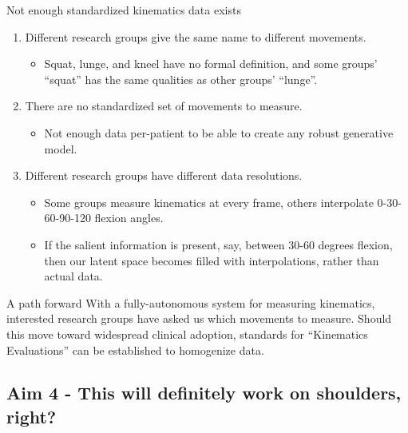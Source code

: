 \documentclass[presentation, aspectratio=1610]{beamer}
\begin{document}
\begin{frame}[label={sec:org3f98a28}]{Not enough standardized kinematics data exists}
\begin{enumerate}
\item Different research groups give the same name to different movements.
\begin{itemize}
\item Squat, lunge, and kneel have no formal definition, and some groups' ``squat'' has the same qualities as other groups' ``lunge''.
\end{itemize}
\item There are no standardized set of movements to measure.
\begin{itemize}
\item Not enough data per-patient to be able to create any robust generative model.
\end{itemize}
\item Different research groups have different data resolutions.
\begin{itemize}
\item Some groups measure kinematics at every frame, others interpolate 0-30-60-90-120 flexion angles.
\item If the salient information is present, say, between 30-60 degrees flexion, then our latent space becomes filled with interpolations, rather than actual data.
\end{itemize}
\end{enumerate}
\end{frame}
\begin{frame}[label={sec:org7721a5c}]{A path forward}
With a fully-autonomous system for measuring kinematics, interested research groups have asked us which movements to measure. Should this move toward widespread clinical adoption, standards for ``Kinematics Evaluations'' can be established to homogenize data.
\end{frame}
\subsection{Aim 4 - This will definitely work on shoulders, right?}
\label{sec:org543e52a}
\end{document}
